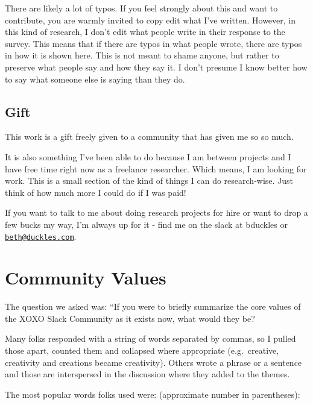 \documentclass[
]{book}
\begin{document}
There are likely a lot of typos. If you feel strongly about this and want to contribute, you are warmly invited to copy edit what I've written. However, in this kind of research, I don't edit what people write in their response to the survey. This means that if there are typos in what people wrote, there are typos in how it is shown here. This is not meant to shame anyone, but rather to preserve what people say and how they say it. I don't presume I know better how to say what someone else is saying than they do.

\section{Gift}\label{gift}

This work is a gift freely given to a community that has given me so so much.

It is also something I've been able to do because I am between projects and I have free time right now as a freelance researcher. Which means, I am looking for work. This is a small section of the kind of things I can do research-wise. Just think of how much more I could do if I was paid!

If you want to talk to me about doing research projects for hire or want to drop a few bucks my way, I'm always up for it - find me on the slack at bduckles or \href{mailto:beth@duckles.com}{\nolinkurl{beth@duckles.com}}.

\chapter{Community Values}\label{community-values}

The question we asked was: ``If you were to briefly summarize the core values of the XOXO Slack Community as it exists now, what would they be?

Many folks responded with a string of words separated by commas, so I pulled those apart, counted them and collapsed where appropriate (e.g.~creative, creativity and creations became creativity). Others wrote a phrase or a sentence and those are interspersed in the discussion where they added to the themes.

The most popular words folks used were: (approximate number in parentheses):
\end{document}
